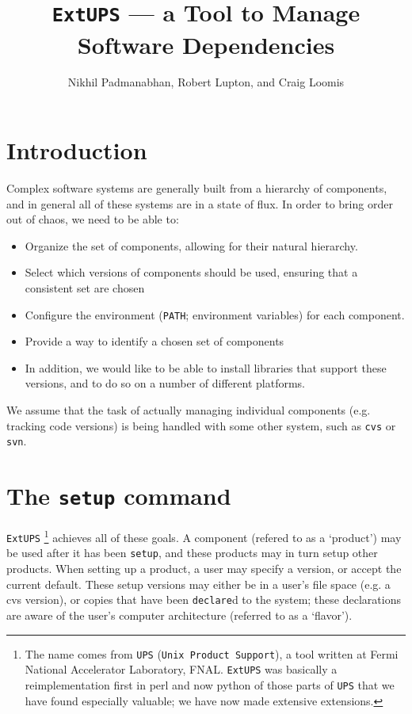 \documentclass{article}
\newcommand{\code}[1]{\texttt{#1}}
\newcommand{\eups}{\code{ExtUPS}}
\begin{document}
\title{\eups{} --- a Tool to Manage Software Dependencies}
\author{Nikhil Padmanabhan, Robert Lupton, and Craig Loomis}

\maketitle

\tableofcontents
\newpage


\section{Introduction}

Complex software systems are generally built from a hierarchy of
components, and in general all of these systems are in a state of
flux.  In order to bring order out of chaos, we need to be able to:
\begin{itemize}
  \item Organize the set of components, allowing for their natural
    hierarchy.

  \item
    Select which versions of components should be used, ensuring
    that a consistent set are chosen

  \item
    Configure the environment (\code{PATH}; environment variables)
    for each component.

  \item
    Provide a way to identify a chosen set of components

  \item
    In addition, we would like to be able to install libraries that support
    these versions, and to do so on a number of different platforms.
\end{itemize}

We assume that the task of actually managing individual components
(e.g. tracking code versions) is being handled with some other system,
such as \code{cvs} or \code{svn}.

\section{The \code{setup} command}

\eups
\footnote{%
  The name comes from \code{UPS} (\code{Unix Product Support}), a
  tool written at Fermi National Accelerator Laboratory, FNAL. \eups{}
  was basically a reimplementation first in perl and now python of those parts of \code{UPS}
  that we have found especially valuable;  we have now made extensive extensions.}
achieves all of these goals. A component (refered to as a `product')
may be used after it has been \code{setup}, and these products may
in turn setup other products. When setting up a product, a user
may specify a version, or accept the current default. These setup versions
may either be in a user's file space (e.g. a cvs version), or copies
that have been \code{declare}d to the system; these declarations are
aware of the user's computer architecture (referred to as a `flavor').
\end{document}
